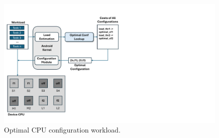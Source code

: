 \documentclass[conference]{IEEEtran}
\begin{document}
\begin{figure}[t]
\begin{center}
\includegraphics[scale=0.6]{ims/EuroPar2024Tool.pdf}
\end{center}
\caption{Optimal CPU configuration workload.}
\label{fig:workflow}
\end{figure}
\end{document}
